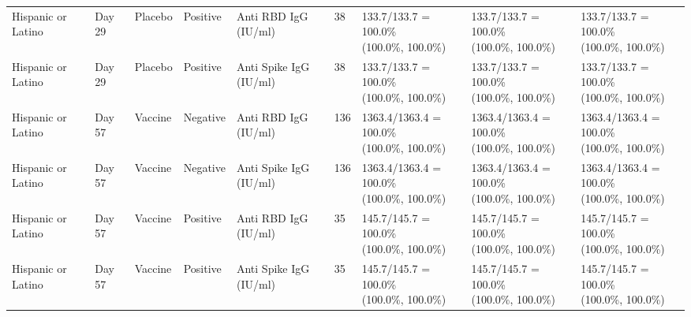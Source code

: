 \documentclass[]{book}
\theoremstyle{definition}
\theoremstyle{definition}
\theoremstyle{definition}
\newcommand{\1}{\mathbbm{1}}
\begin{document}
\begin{landscape}
\begin{ThreePartTable}
\begin{longtable}[t]{>{\raggedright\arraybackslash}p{2.7cm}llllllll}
\hspace{1em}Hispanic or Latino & Day 29 & Placebo & Positive & Anti RBD IgG (IU/ml) & 38 & \makecell[l]{133.7/133.7 = 100.0\%\\(100.0\%, 100.0\%)} & \makecell[l]{133.7/133.7 = 100.0\%\\(100.0\%, 100.0\%)} & \makecell[l]{133.7/133.7 = 100.0\%\\(100.0\%, 100.0\%)}\\
\hspace{1em}Hispanic or Latino & Day 29 & Placebo & Positive & Anti Spike IgG (IU/ml) & 38 & \makecell[l]{133.7/133.7 = 100.0\%\\(100.0\%, 100.0\%)} & \makecell[l]{133.7/133.7 = 100.0\%\\(100.0\%, 100.0\%)} & \makecell[l]{133.7/133.7 = 100.0\%\\(100.0\%, 100.0\%)}\\
\hspace{1em}Hispanic or Latino & Day 57 & Vaccine & Negative & Anti RBD IgG (IU/ml) & 136 & \makecell[l]{1363.4/1363.4 = 100.0\%\\(100.0\%, 100.0\%)} & \makecell[l]{1363.4/1363.4 = 100.0\%\\(100.0\%, 100.0\%)} & \makecell[l]{1363.4/1363.4 = 100.0\%\\(100.0\%, 100.0\%)}\\
\hspace{1em}Hispanic or Latino & Day 57 & Vaccine & Negative & Anti Spike IgG (IU/ml) & 136 & \makecell[l]{1363.4/1363.4 = 100.0\%\\(100.0\%, 100.0\%)} & \makecell[l]{1363.4/1363.4 = 100.0\%\\(100.0\%, 100.0\%)} & \makecell[l]{1363.4/1363.4 = 100.0\%\\(100.0\%, 100.0\%)}\\
\hspace{1em}Hispanic or Latino & Day 57 & Vaccine & Positive & Anti RBD IgG (IU/ml) & 35 & \makecell[l]{145.7/145.7 = 100.0\%\\(100.0\%, 100.0\%)} & \makecell[l]{145.7/145.7 = 100.0\%\\(100.0\%, 100.0\%)} & \makecell[l]{145.7/145.7 = 100.0\%\\(100.0\%, 100.0\%)}\\
\hspace{1em}Hispanic or Latino & Day 57 & Vaccine & Positive & Anti Spike IgG (IU/ml) & 35 & \makecell[l]{145.7/145.7 = 100.0\%\\(100.0\%, 100.0\%)} & \makecell[l]{145.7/145.7 = 100.0\%\\(100.0\%, 100.0\%)} & \makecell[l]{145.7/145.7 = 100.0\%\\(100.0\%, 100.0\%)}\\

\end{longtable}
\end{ThreePartTable}
\end{landscape}
\end{document}
